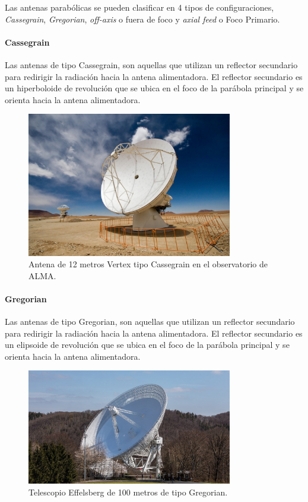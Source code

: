 Las antenas parabólicas se pueden clasificar en 4 tipos de configuraciones, \textit{Cassegrain}, \textit{Gregorian}, \textit{off-axis} o fuera de foco y \textit{axial feed} o Foco Primario.\\

\paragraph{Cassegrain}

Las antenas de tipo Cassegrain, son aquellas que utilizan un reflector secundario para redirigir la radiación hacia la antena alimentadora. El reflector secundario es un hiperboloide de revolución que se ubica en el foco de la parábola principal y se orienta hacia la antena alimentadora.

\begin{figure}
    \centering
    \includegraphics[width = 0.8\textwidth]{img/cassegrain.jpg}
    \caption{Antena de 12 metros Vertex tipo Cassegrain en el observatorio de ALMA.}
    \label{fig:cass}
\end{figure}

\paragraph{Gregorian}

Las antenas de tipo Gregorian, son aquellas que utilizan un reflector secundario para redirigir la radiación hacia la antena alimentadora. El reflector secundario es un elipsoide de revolución que se ubica en el foco de la parábola principal y se orienta hacia la antena alimentadora.

\begin{figure}
    \centering
    \includegraphics[width = 0.8\textwidth]{img/gregorian.jpg}
    \caption{Telescopio Effelsberg de 100 metros de tipo Gregorian.}
    \label{fig:greg}
\end{figure}

